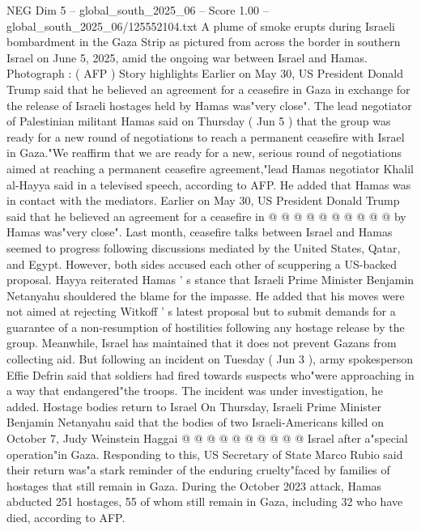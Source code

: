 \begin{textsample}{NEG Dim 5 – global\_south\_2025\_06 – Score 1.00 – global\_south\_2025\_06/125552104.txt}  \label{ex:f5_neg_399}
A plume of smoke erupts during Israeli bombardment in the Gaza Strip as pictured from across the border in southern Israel on June 5, 2025, amid the ongoing war between Israel and Hamas.
Photograph : ( AFP ) Story highlights Earlier on May 30, US President Donald Trump said that he believed an agreement for a ceasefire in Gaza in exchange for the release of Israeli hostages held by Hamas was"very close".
The lead negotiator of Palestinian militant Hamas said on Thursday ( Jun 5 ) that the group was ready for a new round of negotiations to reach a permanent ceasefire with Israel in Gaza."We reaffirm that we are ready for a new, serious round of negotiations aimed at reaching a permanent ceasefire agreement,"lead Hamas negotiator Khalil al-Hayya said in a televised speech, according to AFP.
He added that Hamas was in contact with the mediators.
Earlier on May 30, US President Donald Trump said that he believed an agreement for a ceasefire in @ @ @ @ @ @ @ @ @ @ by Hamas was"very close".
Last month, ceasefire talks between Israel and Hamas seemed to progress following discussions mediated by the United States, Qatar, and Egypt.
However, both sides accused each other of scuppering a US-backed proposal.
Hayya reiterated Hamas ' s stance that Israeli Prime Minister Benjamin Netanyahu shouldered the blame for the impasse.
He added that his moves were not aimed at rejecting Witkoff ' s latest proposal but to submit demands for a guarantee of a non-resumption of hostilities following any hostage release by the group.
Meanwhile, Israel has maintained that it does not prevent Gazans from collecting aid.
But following an incident on Tuesday ( Jun 3 ), army spokesperson Effie Defrin said that soldiers had fired towards suspects who"were approaching in a way that endangered"the troops.
The incident was under investigation, he added.
Hostage bodies return to Israel On Thursday, Israeli Prime Minister Benjamin Netanyahu said that the bodies of two Israeli-Americans killed on October 7, Judy Weinstein Haggai @ @ @ @ @ @ @ @ @ @ Israel after a"special operation"in Gaza.
Responding to this, US Secretary of State Marco Rubio said their return was"a stark reminder of the enduring cruelty"faced by families of hostages that still remain in Gaza.
During the October 2023 attack, Hamas abducted 251 hostages, 55 of whom still remain in Gaza, including 32 who have died, according to AFP.

\end{textsample}
